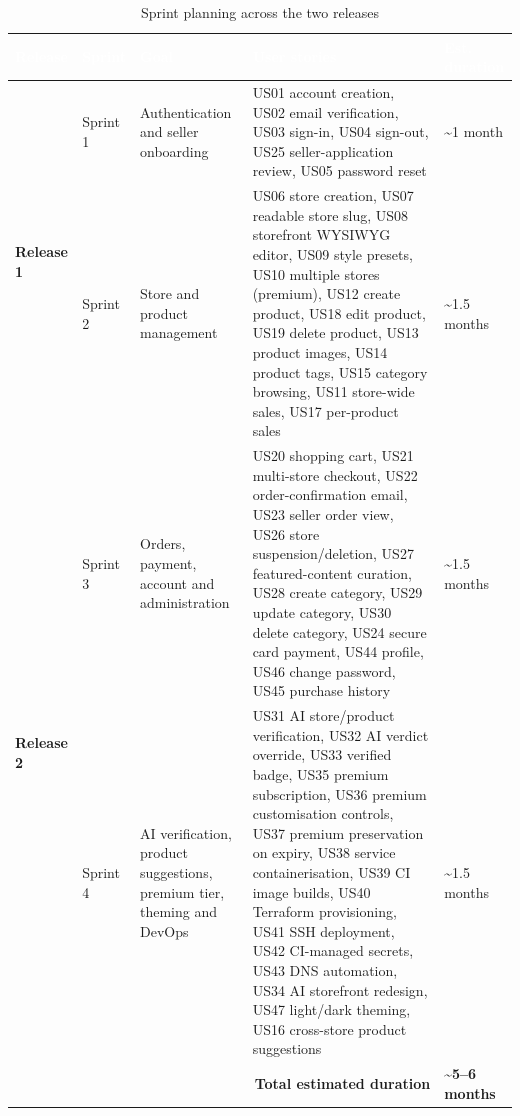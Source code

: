 \begin{table}[H]
  \centering
  \caption{Sprint planning across the two releases}
  \label{tab:sprints}
  \footnotesize
  \begin{tabularx}{\textwidth}{|l|l|>{\raggedright\arraybackslash}p{2.9cm}|X|>{\centering\arraybackslash}p{1.7cm}|}
    \hline
    \rowcolor{tableHeader}
    \textcolor{white}{\textbf{Release}} & \textcolor{white}{\textbf{Sprint}} &
    \textcolor{white}{\textbf{Goal}} & \textcolor{white}{\textbf{User stories}} &
    \textcolor{white}{\textbf{Est. duration}} \\
    \hline
    \multirow{2}{*}{\textbf{Release 1}}
      & Sprint 1 & Authentication and seller onboarding & US01 account creation, US02 email verification, US03 sign-in, US04 sign-out, US25 seller-application review, US05 password reset & \textasciitilde1 month \\
    \cline{2-5}
      & Sprint 2 & Store and product management & US06 store creation, US07 readable store slug, US08 storefront WYSIWYG editor, US09 style presets, US10 multiple stores (premium), US12 create product, US18 edit product, US19 delete product, US13 product images, US14 product tags, US15 category browsing, US11 store-wide sales, US17 per-product sales & \textasciitilde1.5 months \\
    \hline
    \multirow{2}{*}{\textbf{Release 2}}
      & Sprint 3 & Orders, payment, account and administration & US20 shopping cart, US21 multi-store checkout, US22 order-confirmation email, US23 seller order view, US26 store suspension/deletion, US27 featured-content curation, US28 create category, US29 update category, US30 delete category, US24 secure card payment, US44 profile, US46 change password, US45 purchase history & \textasciitilde1.5 months \\
    \cline{2-5}
      & Sprint 4 & AI verification, product suggestions, premium tier, theming and DevOps & US31 AI store/product verification, US32 AI verdict override, US33 verified badge, US35 premium subscription, US36 premium customisation controls, US37 premium preservation on expiry, US38 service containerisation, US39 CI image builds, US40 Terraform provisioning, US41 SSH deployment, US42 CI-managed secrets, US43 DNS automation, US34 AI storefront redesign, US47 light/dark theming, US16 cross-store product suggestions & \textasciitilde1.5 months \\
    \hline
    \multicolumn{4}{|r|}{\textbf{Total estimated duration}} & \textbf{\textasciitilde5--6 months} \\
    \hline
  \end{tabularx}
\end{table}

